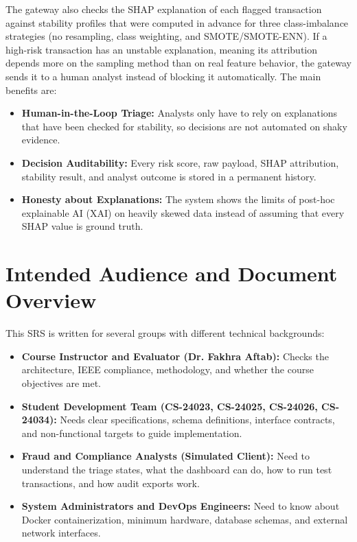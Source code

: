 \documentclass[12pt, a4paper]{report}
\begin{document}
The gateway also checks the SHAP explanation of each flagged transaction against stability profiles that were computed in advance for three class-imbalance strategies (no resampling, class weighting, and SMOTE/SMOTE-ENN). If a high-risk transaction has an unstable explanation, meaning its attribution depends more on the sampling method than on real feature behavior, the gateway sends it to a human analyst instead of blocking it automatically. The main benefits are:
\begin{itemize}
    \item \textbf{Human-in-the-Loop Triage:} Analysts only have to rely on explanations that have been checked for stability, so decisions are not automated on shaky evidence.
    \item \textbf{Decision Auditability:} Every risk score, raw payload, SHAP attribution, stability result, and analyst outcome is stored in a permanent history.
    \item \textbf{Honesty about Explanations:} The system shows the limits of post-hoc explainable AI (XAI) on heavily skewed data instead of assuming that every SHAP value is ground truth.
\end{itemize}

\section{Intended Audience and Document Overview}
This SRS is written for several groups with different technical backgrounds:
\begin{itemize}
    \item \textbf{Course Instructor and Evaluator (Dr. Fakhra Aftab):} Checks the architecture, IEEE compliance, methodology, and whether the course objectives are met.
    \item \textbf{Student Development Team (CS-24023, CS-24025, CS-24026, CS-24034):} Needs clear specifications, schema definitions, interface contracts, and non-functional targets to guide implementation.
    \item \textbf{Fraud and Compliance Analysts (Simulated Client):} Need to understand the triage states, what the dashboard can do, how to run test transactions, and how audit exports work.
    \item \textbf{System Administrators and DevOps Engineers:} Need to know about Docker containerization, minimum hardware, database schemas, and external network interfaces.
\end{itemize}
\end{document}
